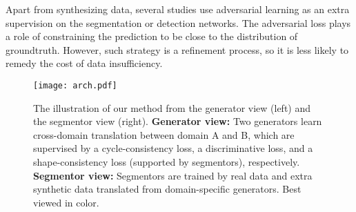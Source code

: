 \documentclass[10pt,twocolumn,letterpaper]{article}
\begin{document}
Apart from synthesizing data, several studies \cite{kohl2017adversarial,luc2016semantic,yang2017automatic,xue2017segan} use adversarial learning as an extra supervision on the segmentation or detection networks. The adversarial loss plays a role of constraining the prediction to be close to the distribution of groundtruth. However, such strategy is a refinement process, so it is less likely to remedy the cost of data insufficiency. 


\begin{figure*}[t]
	\begin{center}
		\texttt{[image: arch.pdf]}
	\end{center}
	\vspace{-.2cm}
	\caption{The illustration of our method from the generator view (left) and the segmentor view (right). \textbf{Generator view:} Two generators learn cross-domain translation between domain A and B, which are supervised by a cycle-consistency loss, a discriminative loss, and a shape-consistency loss (supported by segmentors), respectively. \textbf{Segmentor view:} Segmentors are trained by real data and extra synthetic data translated from domain-specific generators. Best viewed in color. \vspace{-.4cm}} \label{fig:arch}
\end{figure*}



\end{document}
